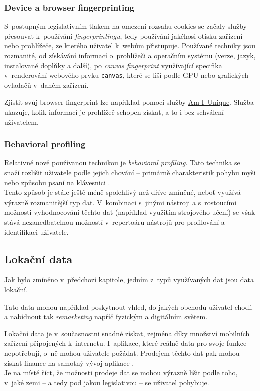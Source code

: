 \subsubsection*{Device a browser fingerprinting}
S~postupným legislativním tlakem na omezení rozsahu cookies se začaly služby přesouvat k~používání \textit{fingerprintingu}, tedy používání jakéhosi otisku zařízení nebo prohlížeče, ze kterého uživatel k~webům přistupuje. Používané techniky jsou rozmanité, od získávání informací o~prohlížeči a operačním systému (verze, jazyk, instalované doplňky a další), po \textit{canvas fingerprint} využívající specifika v~renderování webového prvku \verb|canvas|, které se liší podle GPU nebo grafických ovladačů v~daném zařízení.  

Zjistit svůj browser fingerprint lze například pomocí služby \href{https://amiunique.org/fp}{Am I~Unique}. Služba ukazuje, kolik informací je prohlížeč schopen získat, a to i bez schválení uživatelem.

\subsubsection*{Behavioral profiling}
Relativně nově používanou technikou je \textit{behavioral profiling}. Tato technika se snaží rozlišit uživatele podle jejich chování -- primárně charakteristik pohybu myši nebo způsobu psaní na klávesnici \citep{behavioral-profiling, mouse-behavioral-biometrics, digital-behavior-fingerprint}.\\
Tento způsob je stále ještě méně spolehlivý než dříve zmíněné, neboť využívá výrazně rozmanitější typ dat.
V~kombinaci s~jinými nástroji a s~rostoucími možnosti vyhodnocování těchto dat (například využitím strojového učení) se však stává nezanedbatelnou možností v~repertoáru nástrojů pro profilování a identifikaci uživatele.

\subsection{Lokační data}
Jak bylo zmíněno v~předchozí kapitole, jedním z~typů využívaných dat jsou data lokační.

Tato data mohou například poskytnout vhled, do jakých obchodů uživatel chodí, a nabídnout tak \textit{remarketing} napříč fyzickým a digitálním světem.

Lokační data je v~současnostni snadné získat, zejména díky množství mobilních zařízení připojených k~internetu. I~aplikace, které reálně data pro svoje funkce nepotřebují, o~ně mohou uživatele požádat. Prodejem těchto dat pak mohou získat finance na samotný vývoj aplikace .\\
Je na místě říct, že možnosti prodeje dat se mohou výrazně lišit podle toho, v~jaké zemi -- a tedy pod jakou legislativou -- se uživatel pohybuje.

